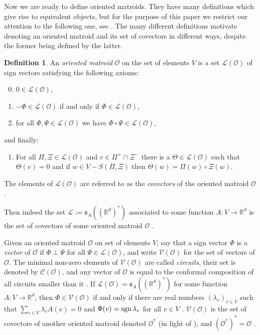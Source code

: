 \documentclass[a4paper,11pt,reqno, english]{amsart}
\theoremstyle{definition}
\newtheorem{definition}[theorem]{Definition}
\theoremstyle{remark}
\newcommand\R{\mathbb R}
\newcommand\sgn{{\rm sgn\,}}
\begin{document}
Now we are ready to define oriented matroids. They have many definitions which give rise to equivalent objects, but for the purpose of this paper we restrict our attention to the following one, see \cite[Propositions 3.7.5, 3.7.9]{OrientedMatroids}. The many different definitions motivate denoting an oriented matroid and its set of covectors in different ways, despite the former being defined by the latter.
\begin{definition}\label{def:om}
    An \emph{oriented matroid} $\mathscr{O}$ on the set of elements $V$ is a set $\mathscr{L}(\mathscr{O})$ of sign vectors satisfying the following axioms:
    \begin{enumerate}[label=\normalfont{(V\arabic*)}]
        \setcounter{enumi}{-1}
        \item $0\in\mathscr{L}(\mathscr{O})$,
        \item $-\Phi\in\mathscr{L}(\mathscr{O})$ if and only if $\Phi\in\mathscr{L}(\mathscr{O})$,
        \item for all $\Phi,\Psi\in\mathscr{L}(\mathscr{O})$ we have $\Phi\circ\Psi\in\mathscr{L}(\mathscr{O})$,
    \end{enumerate}
    and finally:
    \begin{enumerate}[resume,label=\normalfont{(V\arabic*')}]
        \item\label{def:om:elim} For all $\Pi,\Xi\in\mathscr{L}(\mathscr{O})$ and $v\in\Pi^+\cap\Xi^-$ there is a $\Theta\in\mathscr{L}(\mathscr{O})$ such that $\Theta(v)=0$ and if $w\in V-S(\Pi,\Xi)$ then $\Theta(w)=\Pi(w)\circ\Xi(w)$.
    \end{enumerate}
    The elements of $\mathscr{L}(\mathscr{O})$ are referred to as the \emph{covectors} of the oriented matroid $\mathscr{O}$.
    \end{definition}
Then indeed the set $\mathscr{L}:=\mathfrak{s}_A((\R^d)^*)$ associated to some function $A\colon V\to\R^d$ is the set of covectors of some oriented matroid $\mathscr{O}$ \cite[Section 2.1]{OrientedMatroidsToday}.

Given an oriented matroid $\mathscr{O}$ on set of elements $V$, say that a sign vector $\Phi$ is a \emph{vector} of $\mathscr{O}$ if $\Phi\perp\Psi$ for all $\Psi\in\mathscr{L}(\mathscr{O})$, and write $\mathscr{V}(\mathscr{O})$ for the set of vectors of $\mathscr{O}$. The minimal non-zero elements of $\mathscr{V}(\mathscr{O})$ are called \emph{circuits}, their set is denoted by $\mathscr{C}(\mathscr{O})$, and any vector of $\mathscr{O}$ is equal to the conformal composition of all circuits smaller than it \cite[Proposition 3.7.2]{OrientedMatroids}. If $\mathscr{L}(\mathscr{O})=\mathfrak{s}_A((\R^d)^*)$ for some function $A\colon V\to\R^d$, then $\Phi\in\mathscr{V}(\mathscr{O})$ if and only if there are real numbers $(\lambda_v)_{v\in V}$ such that $\sum_{v\in V}\lambda_vA(v)=0$ and $\Phi(v)=\sgn\lambda_v$ for all $v\in V$ \cite[Section 2.1]{OrientedMatroidsToday}. $\mathscr{V}(\mathscr{O})$ is the set of covectors of another oriented matroid denoted $\mathscr{O}^*$ \cite[Proposition 3.7.12]{OrientedMatroids} (in light of \cite[Proposition 3.4.1]{OrientedMatroids}), and $(\mathscr{O}^*)^*=\mathscr{O}$ \cite[Proposition 3.4.1]{OrientedMatroids}.
\end{document}
